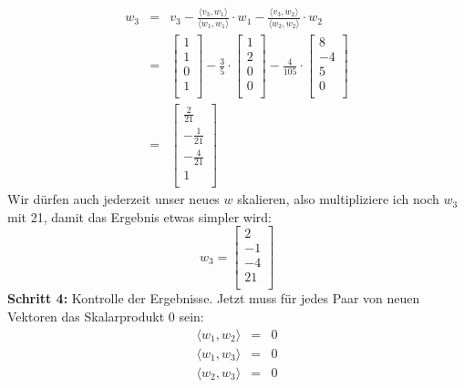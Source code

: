 \documentclass{article}
\begin{document}
			\begin{eqnarray*}
				w_3 &=& v_3 - \frac{\langle v_3, w_1 \rangle}{\langle w_1, w_1 \rangle} \cdot w_1 - \frac{\langle v_3, w_2 \rangle}{\langle w_2, w_2 \rangle} \cdot w_2\\
				&=& \begin{bmatrix} 1 \\ 1 \\ 0 \\ 1 \\ \end{bmatrix} - \frac35 \cdot \begin{bmatrix} 1 \\ 2 \\ 0 \\ 0 \\ \end{bmatrix} - \frac4{105} \cdot \begin{bmatrix} 8 \\ -4 \\ 5 \\ 0 \\ \end{bmatrix} \\
				&=& \begin{bmatrix} \frac2{21} \\ -\frac{1}{21} \\ -\frac4{21} \\ 1 \\ \end{bmatrix}
			\end{eqnarray*}
			Wir dürfen auch jederzeit unser neues $w$ skalieren, also multipliziere ich noch $w_3$ mit 21, damit das Ergebnis etwas simpler wird:\\
			\begin{equation*}
				w_3 =  \begin{bmatrix} 2 \\ -1 \\ -4 \\ 21 \\ \end{bmatrix}
			\end{equation*}
			\textbf{Schritt 4:}
			Kontrolle der Ergebnisse. Jetzt muss für jedes Paar von neuen Vektoren das Skalarprodukt 0 sein:
			\begin{eqnarray*}
				\langle w_1, w_2 \rangle &=& 0 \\
				\langle w_1, w_3 \rangle &=& 0 \\
				\langle w_2, w_3 \rangle &=& 0
			\end{eqnarray*}
\end{document}
